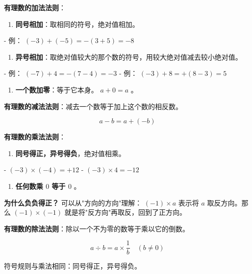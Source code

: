 \begin{understand}


\textbf{有理数的加法法则}：

\begin{enumerate}
  \item \textbf{同号相加}：取相同的符号，绝对值相加。
\end{enumerate}

   - 例： $(-3) + (-5) = -(3+5) = -8$
\begin{enumerate}
  \item \textbf{异号相加}：取绝对值较大的那个数的符号，用较大绝对值减去较小绝对值。
\end{enumerate}

   - 例： $(-7) + 4 = -(7-4) = -3$
   - 例： $(-3) + 8 = +(8-3) = 5$
\begin{enumerate}
  \item \textbf{一个数加零}：等于它本身。 $a + 0 = a$ 。
\end{enumerate}


\textbf{有理数的减法法则}：减去一个数等于加上这个数的相反数。

\[
a - b = a + (-b)
\]


\textbf{有理数的乘法法则}：

\begin{enumerate}
  \item \textbf{同号得正，异号得负}，绝对值相乘。
\end{enumerate}

   - $(-3) \times (-4) = +12$
   - $(-3) \times 4 = -12$
\begin{enumerate}
  \item \textbf{任何数乘 $0$ 等于 $0$ }。
\end{enumerate}


\textbf{为什么负负得正？} 可以从"方向的方向"理解： $(-1) \times a$ 表示将 $a$ 取反方向。那么 $(-1) \times (-1)$ 就是将"反方向"再取反，回到了正方向。

\textbf{有理数的除法法则}：除以一个不为零的数等于乘以它的倒数。

\[
a \div b = a \times \frac{1}{b} \quad (b \neq 0)
\]


符号规则与乘法相同：同号得正，异号得负。

\end{understand}

